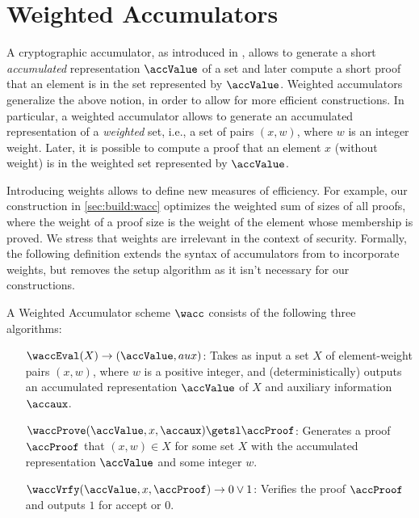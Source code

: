 
\section{Weighted Accumulators}\label{sec:accumulators}

A cryptographic accumulator, as introduced in \cite{EC:BenDeM93}, allows to generate a short \emph{accumulated}
representation $\accValue$ of a set and later compute a short proof that an element is in the set represented by
$\accValue$. Weighted accumulators generalize the above notion, in order to allow for more efficient constructions. In
particular, a weighted accumulator allows to generate an accumulated representation of a \emph{weighted} set, i.e., a
set of pairs $(x,w)$, where $w$ is an integer weight. %
Later, it is possible to compute a proof that an element $x$ (without weight) is in the weighted set represented by $\accValue$.

Introducing weights allows to define new measures of efficiency. For example, our construction in \cref{sec:build:wacc} optimizes the weighted sum of sizes of all proofs, where the weight of a proof size is the weight of the element whose membership is proved. We stress that weights are irrelevant in the context of security.
%
Formally, the following definition extends the syntax of accumulators from \cite{EC:BarPfi97} to incorporate weights,
but removes the setup algorithm as it isn't necessary for our constructions.
\begin{definition}
  A Weighted Accumulator scheme $\wacc$ consists of the following three algorithms:
  \begin{itemize}[align=left, nosep]
  \item[$\waccEval(X)\rightarrow(\accValue, aux)$:] Takes as input a set $X$ of element-weight pairs $(x,w)$, where $w$
    is a positive integer, and (deterministically) outputs an accumulated representation $\accValue$ of $X$ and auxiliary information $\accaux$.
  \item[$\waccProve(\accValue, x, \accaux)\getsl\accProof$:] Generates a proof $\accProof$ that $(x,w) \in X$ for some
    set $X$ with the accumulated representation $\accValue$ and some integer $w$.
  \item[$\waccVrfy(\accValue, x, \accProof)\rightarrow 0\vee 1$:] Verifies the proof $\accProof$ and outputs $1$ for accept or $0$.
  \end{itemize}
\end{definition}


